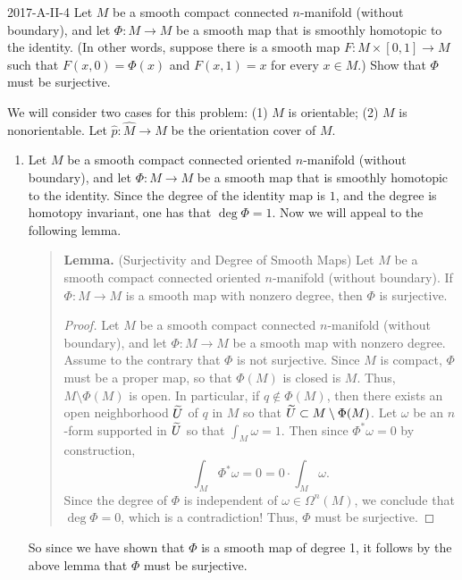 \documentclass{article}
\begin{document}
	\begin{prb}{2017-A-II-4}
		Let $M$ be a smooth compact connected $n$-manifold (without boundary), and let $\Phi: M\to M$ be a smooth map that is smoothly homotopic to the identity. (In other words, suppose there is a smooth map $F: M \times [0,1] \to M$ such that $F(x,0) = \Phi(x)$ and $F(x,1) = x$ for every $x \in M$.) Show that $\Phi$ must be surjective. 
	\end{prb}
	We will consider two cases for this problem: (1) $M$ is orientable; (2) $M$ is nonorientable. Let $\hat{p}: \hat{M} \to M$ be the orientation cover of $M$. 
	\begin{enumerate}[itemsep =-2pt,label = (\arabic{*})]
		\item Let $M$ be a smooth compact connected oriented $n$-manifold (without boundary), and let $\Phi: M \to M$ be a smooth map that is smoothly homotopic to the identity. Since the degree of the identity map is $1$, and the degree is homotopy invariant, one has that $\deg{\Phi} = 1$. Now we will appeal to the following lemma. 
		\begin{quote}
			\textbf{Lemma.} (Surjectivity and Degree of Smooth Maps) Let $M$ be a smooth compact connected oriented $n$-manifold (without boundary). If $\Phi: M \to M$ is a smooth map with nonzero degree, then $\Phi$ is surjective. \vspace{-0.25cm}
			
			\begin{proof}
				Let $M$ be a smooth compact connected $n$-manifold (without boundary), and let $\Phi: M \to M$ be a smooth map with nonzero degree. Assume to the contrary that $\Phi$ is not surjective. Since $M$ is compact, $\Phi$ must be a proper map, so that $\Phi(M)$ is closed is $M$. Thus, $M \setminus \Phi(M)$ is open. In particular, if $q \notin \Phi(M)$, then there exists an open neighborhood $\widetilde{U}$ of $q$ in $M$ so that $\widetilde{U} \subset M \setminus \Phi(M)$. Let $\omega$ be an $n$-form supported in $\widetilde{U}$ so that $\int_{M}\omega = 1$. Then since $\Phi^{\ast}\omega = 0$ by construction, 
				\begin{equation*}
					\int_{M}\Phi^{\ast}\omega = 0 = 0 \cdot \int_{M}\omega. 
				\end{equation*}
				Since the degree of $\Phi$ is independent of $\omega \in \Omega^{n}(M)$, we conclude that $\deg{\Phi} = 0$, which is a contradiction! Thus, $\Phi$ must be surjective. 
			\end{proof}
		\end{quote}
		So since we have shown that $\Phi$ is a smooth map of degree 1, it follows by the above lemma that $\Phi$ must be surjective. 
		

\end{enumerate}
\end{document}
